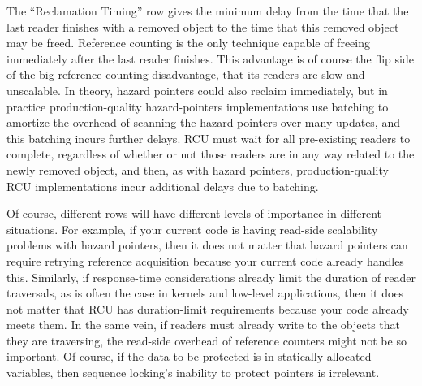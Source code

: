 \QuickQuizEnd

The ``Reclamation Timing'' row gives the minimum delay from the time that
the last reader finishes with a removed object to the time that this
removed object may be freed.
Reference counting is the only technique capable of freeing immediately
after the last reader finishes.
This advantage is of course the flip side of the big reference-counting
disadvantage, that its readers are slow and unscalable.
In theory, hazard pointers could also reclaim immediately, but in practice
production-quality hazard-pointers implementations use batching to amortize
the overhead of scanning the hazard pointers over many updates, and this
batching incurs further delays.
RCU must wait for all pre-existing readers to complete, regardless
of whether or not those readers are in any way related to the newly
removed object, and then, as with hazard pointers, production-quality
RCU implementations incur additional delays due to batching.

Of course, different rows will have different levels of importance in
different situations.
For example, if your current code is having read-side scalability problems
with hazard pointers, then it does not matter that hazard pointers can require
retrying reference acquisition because your current code already handles
this.
Similarly, if response-time considerations already limit the duration
of reader traversals, as is often the case in kernels and low-level
applications, then it does not matter that RCU has duration-limit
requirements because your code already meets them.
In the same vein, if readers must already write to the objects that they
are traversing, the read-side overhead of reference counters might
not be so important.
Of course, if the data to be protected is in statically allocated variables,
then sequence locking's inability to protect pointers is irrelevant.

